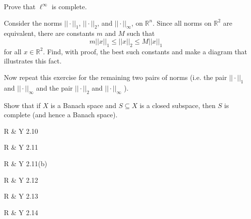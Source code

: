 \documentclass[minion]{homework}
\newcommand{\Reals}{\mathbb{R}}
\begin{document}
\begin{aproblems}

\hproblem Prove that $\ell^\infty$ is complete.

\hproblem Consider the norms $||\cdot||_1$, $||\cdot||_2$, and
$||\cdot||_\infty$, on $\Reals^n$.  Since all norms on $\Reals^2$
are equivalent, there are constants $m$ and $M$ such that
\[
m||x||_1 \le ||x||_2 \le M||x||_1
\]
for all $x\in\Reals^2$.  Find, with proof, the best such constants
and make a diagram that illustrates this fact.  

Now repeat this exercise for the remaining two pairs of norms 
(i.e. the pair $||\cdot||_1$ and $||\cdot||_\infty$ and the pair
$||\cdot||_2$ and $||\cdot||_\infty$ ).

\hproblem Show that if $X$ is a Banach space and $S\subseteq X$ is a
closed subspace, then $S$ is complete (and hence a Banach space).

\hproblem R \& Y 2.10

\hproblem R \& Y 2.11

\hproblem R \& Y 2.11(b)

\hproblem R \& Y 2.12

\hproblem R \& Y 2.13

\hproblem R \& Y 2.14

\end{aproblems}
\end{document}
